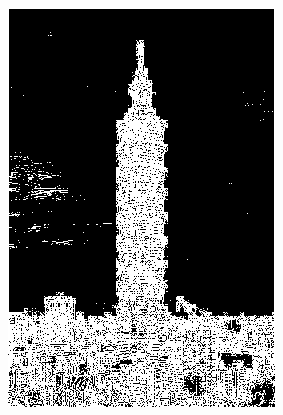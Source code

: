\documentclass[12pt,a4paper]{report}
\begin{document}
\begin{figure}[!htb]
  \centering
  \begin{subfigure}{0.45\linewidth}
    \includegraphics[width=1\linewidth]{output/taipei101_Q4_t_16.png}
  \end{subfigure}
  \begin{subfigure}{0.45\linewidth}

\end{subfigure}
\end{figure}
\end{document}
